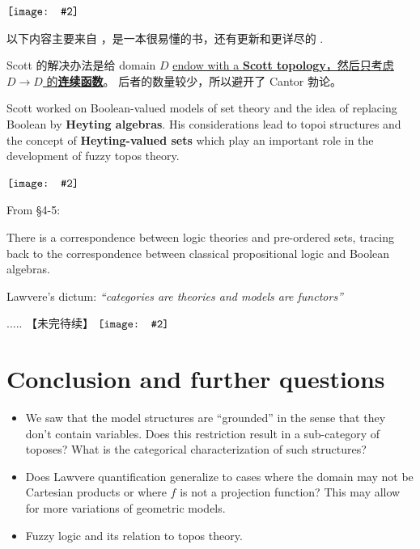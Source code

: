 \documentclass[12pt, orivec]{article}
\newcommand{\cc}[2]{#1}
\newcommand{\cc}[2]{#2}
\newcommand{\book}[1]{$\NewSym[0.4]{../book-icon.png} \quad$ \parbox{0.9\textwidth}{\footnotesize #1}}
\newcommand*\NewSym[2][0.5]{\vcenter{\hbox{\texttt{[image: \#2]}}}}
\begin{document}
\book{以下内容主要来自 \parencite{Vickers1989}，是一本很易懂的书，还有更新和更详尽的 \parencite{Goubault-Larrecq2013}.}

\cc{Scott 的解决办法是给 domain $D$ \uline{endow with a \textbf{Scott topology}，然后只考虑 $D \rightarrow D$ 的}\textbf{\uline{连续函数}}。 后者的数量较少，所以避开了 Cantor 勃论。 
}{
Scott's solution is to give domain $D$ \uline{endow with a \textbf{Scott topology} and then only consider $D \rightarrow D$'s }\textbf{\uline{continuous function}}. The latter is a small number, so it avoids Cantor's theory.}

Scott worked on Boolean-valued models of set theory and the idea of replacing Boolean by \textbf{Heyting algebras}.  His considerations lead to topoi structures and the concept of \textbf{Heyting-valued sets} which play an important role in the development of fuzzy topos theory.

\book{ From \parencite{Pitts1991} \S 4-5:  }

There is a correspondence between logic theories and pre-ordered sets, tracing back to the correspondence between classical propositional logic and Boolean algebras.

Lawvere's dictum:  \textit{``categories are theories and models are functors''}



\cc{..... 【未完待续】 $\NewSym{../UnderConst.png}$
}{
..... [To be continued] $\NewSym{../UnderConst.png}$}

\section{Conclusion and further questions}

\begin{itemize}
\item We saw that the model structures are ``grounded'' in the sense that they don't contain variables.  Does this restriction result in a sub-category of toposes?  What is the categorical characterization of such structures?

\item Does Lawvere quantification generalize to cases where the domain may not be Cartesian products or where $f$ is not a projection function?  This may allow for more variations of geometric models.

\item Fuzzy logic and its relation to topos theory.
\end{itemize}

\printbibliography
\end{document}
